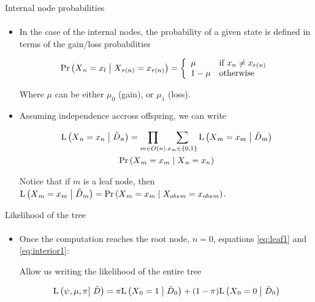 \documentclass[9pt,ignorenonframetext,aspectratio=169]{beamer}
\newcommand{\Prcond}[2]{{\mbox{Pr}\left(#1\vphantom{#2}\;\right|\left.\vphantom{#1}#2\right)}}
\newcommand{\Likecond}[2]{{\mbox{L}\left(#1\vphantom{#2}\;\right|\left.\vphantom{#1}#2\right)}}
\newcommand{\likelihood}[2]{\mbox{L}\left(#1\vphantom{#2}\right|\left.\vphantom{#1}#2\right)}
\newcommand{\aphylo}{D{}}      %
\newcommand{\aphyloObs}{\tilde \aphylo{}} %
\newcommand{\Ann}{X{}} %
\newcommand{\ann}{x{}} %
\newcommand{\AnnObs}{{X_{obs}}{}}%
\newcommand{\annObs}{{x_{obs}}{}}%
\begin{document}
\begin{frame}[t,label=internalnodeprob]{Internal node probabilities}

\framesubtitle{\hyperlink{peelingalgorithm}{}}

\begin{itemize}
\item
  In the case of the internal nodes, the probability of a given state is
  defined in terms of the gain/loss probabilities

  \[
  \Prcond{\Ann_{n} = \ann_{l}}{\Ann_{r(n)} = \ann_{r(n)}} = \left\{
  \begin{array}{ll}
  \mu & \mbox{if }\ann_{n} \neq \ann_{r(n)} \\
  1 - \mu & \mbox{otherwise}
  \end{array}
  \right.
  \]

  Where \(\mu\) can be either \(\mu_0\) (gain), or \(\mu_1\) (loss).
\item
  Assuming independence accross offspring, we can write

  \begin{multline}
  \label{eq:interior1}
  \Likecond{\Ann_n = \ann_n}{\aphyloObs_n} = %
  \prod_{m \in O(n)} \sum_{\ann_m \in \{0,1\}} \Likecond{\Ann_m = \ann_m}{\aphyloObs_m} \\
  \Prcond{\Ann_{m} = \ann_{m}}{\Ann_{n} = \ann_{n}}
  \end{multline}

  Notice that if \(m\) is a leaf node, then
  \(\Likecond{\Ann_m = \ann_m}{\aphyloObs_m} = \Prcond{\Ann_m = \ann_m}{\AnnObs_m = \annObs_m}\).
\end{itemize}

\end{frame}

\begin{frame}[t,label=likelihood]{Likelihood of the tree}

\framesubtitle{\hyperlink{peelingalgorithm}{}}

\begin{itemize}
\item
  Once the computation reaches the root node, \(n=0\), equations
  \eqref{eq:leaf1} and \eqref{eq:interior1}:

  Allow us writing the likelihood of the entire tree

  \begin{equation}
  \label{eq:l}
  \likelihood{\psi, \mu, \pi}{\aphyloObs} = \pi\Likecond{\Ann_0=1}{\aphyloObs_0} + (1 - \pi)\Likecond{\Ann_0=0}{\aphyloObs_0}
  \end{equation}
\end{itemize}

\end{frame}
\end{document}
